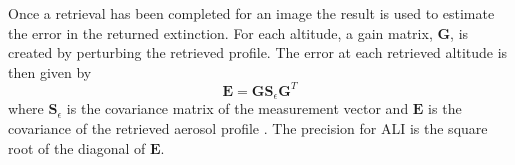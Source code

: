\documentclass[12pt]{article}
\begin{document}
Once a retrieval has been completed for an image the result is used to estimate the error in the returned extinction. For each altitude, a gain matrix, $\mathbf{G}$, is created by perturbing the retrieved profile. The error at each retrieved altitude is then given by
\begin{equation}
    \mathbf{E} = \mathbf{G}\mathbf{S}_{\epsilon}\mathbf{G}^{T}
\end{equation}
where $\mathbf{S}_{\epsilon}$ is the covariance matrix of the measurement vector and $\mathbf{E}$ is the covariance of the retrieved aerosol profile \citep{Rodgers2000}. The precision for ALI is the square root of the diagonal of $\mathbf{E}$.

\end{document}
